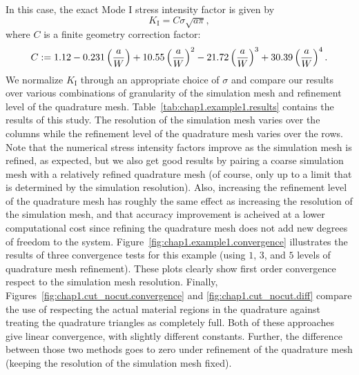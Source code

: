 In this case, the exact Mode I stress intensity factor is given by
\begin{equation*}
K_{\text{I}} = C \sigma \sqrt{a \pi},
\end{equation*}
where $C$ is a finite geometry correction factor:
\begin{equation*}
C := 1.12 - 0.231 \left( \frac{a}{W} \right) + 10.55 \left( \frac{a}{W} \right)^2 - 21.72 \left( \frac{a}{W} \right)^3 + 30.39 \left( \frac{a}{W} \right)^4.
\end{equation*}
We normalize $K_{\text{I}}$ through an appropriate choice of $\sigma$ and compare our results over various combinations of granularity of the simulation mesh and refinement level of the quadrature mesh. Table~\ref{tab:chap1.example1.results} contains the results of this study. The resolution of the simulation mesh varies over the columns while the refinement level of the quadrature mesh varies over the rows. Note that the numerical stress intensity factors improve as the simulation mesh is refined, as expected, but we also get good results by pairing a coarse simulation mesh with a relatively refined quadrature mesh (of course, only up to a limit that is determined by the simulation resolution). Also, increasing the refinement level of the quadrature mesh has roughly the same effect as increasing the resolution of the simulation mesh, and that accuracy improvement is acheived at a lower computational cost since refining the quadrature mesh does not add new degrees of freedom to the system. Figure~\ref{fig:chap1.example1.convergence} illustrates the results of three convergence tests for this example (using $1$, $3$, and $5$ levels of quadrature mesh refinement). These plots clearly show first order convergence respect to the simulation mesh resolution. Finally, Figures~\ref{fig:chap1.cut_nocut.convergence} and \ref{fig:chap1.cut_nocut.diff} compare the use of respecting the actual material regions in the quadrature against treating the quadrature triangles as completely full. Both of these approaches give linear convergence, with slightly different constants. Further, the difference between those two methods goes to zero under refinement of the quadrature mesh (keeping the resolution of the simulation mesh fixed).

